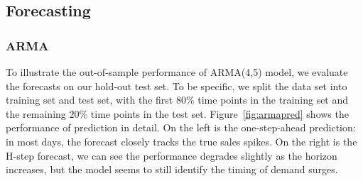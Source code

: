 \documentclass{article}
\begin{document}
\subsection{Forecasting}

\subsubsection{ARMA}

\noindent To illustrate the out-of-sample performance of ARMA(4,5) model, we evaluate the forecasts on our hold-out test set. To be specific, we split the data set into training set and test set, with the first $80\%$ time points in the training set and the remaining $20\%$ time points in the test set. Figure~\ref{fig:armapred} shows the performance of prediction in detail. On the left is the one-step-ahead prediction: in most days, the forecast closely tracks the true sales spikes. On the right is the H-step forecast, we can see the performance degrades slightly as the horizon increases, but the model seems to still identify the timing of demand surges. 
\end{document}

